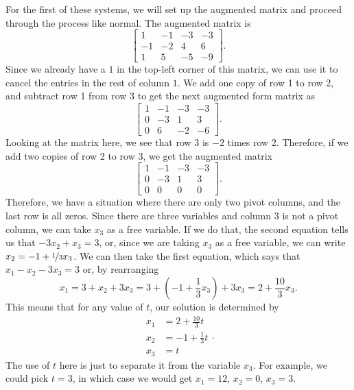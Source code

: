 \begin{exampleSol}
For the first of these systems, we will set up the augmented matrix and proceed through the process like normal. The augmented matrix is
\begin{equation*}
\left[ 
\begin{array}{ccc|c}
1 & -1 & -3 & -3 \\
-1 & -2 & 4 & 6 \\
1 & 5 & -5 & -9
\end{array}
\right].
\end{equation*}
Since we already have a $1$ in the top-left corner of this matrix, we can use it to cancel the entries in the rest of column $1$.  We add one copy of row 1 to row 2, and subtract row 1 from row 3 to get the next augmented form matrix as
\begin{equation*}
\left[ 
\begin{array}{ccc|c}
1 & -1 & -3 & -3 \\
0 & -3 & 1 & 3 \\
0 & 6 & -2 & -6
\end{array}
\right].
\end{equation*}
Looking at the matrix here, we see that row 3 is $-2$ times row 2. Therefore, if we add two copies of row 2 to row 3, we get the augmented matrix
\begin{equation*}
\left[ 
\begin{array}{ccc|c}
1 & -1 & -3 & -3 \\
0 & -3 & 1 & 3 \\
0 & 0 & 0 & 0
\end{array}
\right].
\end{equation*}
Therefore, we have a situation where there are only two pivot columns, and the last row is all zeros. Since there are three variables and column 3 is not a pivot column, we can take $x_3$ as a free variable. If we do that, the second equation tells us that $-3x_2 + x_3 = 3$, or, since we are taking $x_3$ as a free variable, we can write $x_2 = -1 + \nicefrac{1}{3}x_3$. We can then take the first equation, which says that $x_1 - x_2 - 3x_3 = 3$ or, by rearranging
\begin{equation*}
x_1 = 3 + x_2 + 3x_3 = 3 + \left(-1 + \frac{1}{3}x_3\right) + 3x_3 = 2 + \frac{10}{3}x_3.
\end{equation*}
This means that for any value of $t$, our solution is determined by
\begin{equation*}
\begin{split}
x_1 &=  2 + \frac{10}{3}t \\
x_2 &= -1 + \frac{1}{3}t  \\
x_3 &= t
\end{split}.
\end{equation*}
The use of $t$ here is just to separate it from the variable $x_3$. For example, we could pick $t=3$, in which case we would get $x_1 = 12$, $x_2 = 0$, $x_3 = 3$. 


\end{exampleSol}
